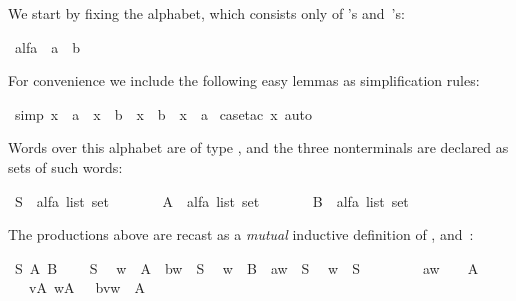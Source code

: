 \begin{isabellebody}
\begin{isamarkuptext}
We start by fixing the alphabet, which consists only of 's
and~'s:%
\end{isamarkuptext}%
\ alfa\ {\isacharequal}\ a\ {\isacharbar}\ b%
\begin{isamarkuptext}%
\noindent
For convenience we include the following easy lemmas as simplification rules:%
\end{isamarkuptext}%
\ {\isacharbrackleft}simp{\isacharbrackright}{\isacharcolon}\ {\isachardoublequote}{\isacharparenleft}x\ {\isasymnoteq}\ a{\isacharparenright}\ {\isacharequal}\ {\isacharparenleft}x\ {\isacharequal}\ b{\isacharparenright}\ {\isasymand}\ {\isacharparenleft}x\ {\isasymnoteq}\ b{\isacharparenright}\ {\isacharequal}\ {\isacharparenleft}x\ {\isacharequal}\ a{\isacharparenright}{\isachardoublequote}\isanewline
{}\ {\isacharparenleft}case{\isacharunderscore}tac\ x{\isacharcomma}\ auto{\isacharparenright}%
\begin{isamarkuptext}%
\noindent
Words over this alphabet are of type , and
the three nonterminals are declared as sets of such words:%
\end{isamarkuptext}%
\ S\ {\isacharcolon}{\isacharcolon}\ {\isachardoublequote}alfa\ list\ set{\isachardoublequote}\isanewline
\ \ \ \ \ \ \ A\ {\isacharcolon}{\isacharcolon}\ {\isachardoublequote}alfa\ list\ set{\isachardoublequote}\isanewline
\ \ \ \ \ \ \ B\ {\isacharcolon}{\isacharcolon}\ {\isachardoublequote}alfa\ list\ set{\isachardoublequote}%
\begin{isamarkuptext}%
\noindent
The productions above are recast as a \emph{mutual} inductive
definition
of ,  and~:%
\end{isamarkuptext}%
\ S\ A\ B\isanewline
{}\isanewline
\ \ {\isachardoublequote}{\isacharbrackleft}{\isacharbrackright}\ {\isasymin}\ S{\isachardoublequote}\isanewline
\ \ {\isachardoublequote}w\ {\isasymin}\ A\ {\isasymLongrightarrow}\ b{\isacharhash}w\ {\isasymin}\ S{\isachardoublequote}\isanewline
\ \ {\isachardoublequote}w\ {\isasymin}\ B\ {\isasymLongrightarrow}\ a{\isacharhash}w\ {\isasymin}\ S{\isachardoublequote}\isanewline
\isanewline
\ \ {\isachardoublequote}w\ {\isasymin}\ S\ \ \ \ \ \ \ \ {\isasymLongrightarrow}\ a{\isacharhash}w\ \ \ {\isasymin}\ A{\isachardoublequote}\isanewline
\ \ {\isachardoublequote}{\isasymlbrakk}\ v{\isasymin}A{\isacharsemicolon}\ w{\isasymin}A\ {\isasymrbrakk}\ {\isasymLongrightarrow}\ b{\isacharhash}v{\isacharat}w\ {\isasymin}\ A{\isachardoublequote}\isanewline

\end{isabellebody}
